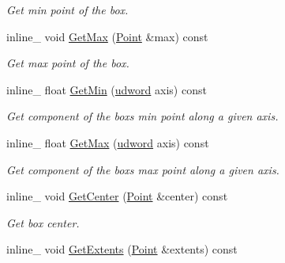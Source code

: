 \begin{DoxyCompactItemize}
\begin{DoxyCompactList}\small\item\em Get min point of the box. \end{DoxyCompactList}\item 
inline\+\_\+ void \hyperlink{classOpcode_1_1AABB_a5e6b0466007c308755a4280007d2c0ee}{Get\+Max} (\hyperlink{classOpcode_1_1Point}{Point} \&max) const \hypertarget{classOpcode_1_1AABB_a5e6b0466007c308755a4280007d2c0ee}{}\label{classOpcode_1_1AABB_a5e6b0466007c308755a4280007d2c0ee}

\begin{DoxyCompactList}\small\item\em Get max point of the box. \end{DoxyCompactList}\item 
inline\+\_\+ float \hyperlink{classOpcode_1_1AABB_a722ee19222271ce6066e7c2437b45e3d}{Get\+Min} (\hyperlink{IceTypes_8h_a44c6f1920ba5551225fb534f9d1a1733}{udword} axis) const \hypertarget{classOpcode_1_1AABB_a722ee19222271ce6066e7c2437b45e3d}{}\label{classOpcode_1_1AABB_a722ee19222271ce6066e7c2437b45e3d}

\begin{DoxyCompactList}\small\item\em Get component of the box\textquotesingle{}s min point along a given axis. \end{DoxyCompactList}\item 
inline\+\_\+ float \hyperlink{classOpcode_1_1AABB_acf448abb3a0abb3165b7be4d8a4872da}{Get\+Max} (\hyperlink{IceTypes_8h_a44c6f1920ba5551225fb534f9d1a1733}{udword} axis) const \hypertarget{classOpcode_1_1AABB_acf448abb3a0abb3165b7be4d8a4872da}{}\label{classOpcode_1_1AABB_acf448abb3a0abb3165b7be4d8a4872da}

\begin{DoxyCompactList}\small\item\em Get component of the box\textquotesingle{}s max point along a given axis. \end{DoxyCompactList}\item 
inline\+\_\+ void \hyperlink{classOpcode_1_1AABB_a2061784d0e109f9f56b28a6a2563a6ee}{Get\+Center} (\hyperlink{classOpcode_1_1Point}{Point} \&center) const \hypertarget{classOpcode_1_1AABB_a2061784d0e109f9f56b28a6a2563a6ee}{}\label{classOpcode_1_1AABB_a2061784d0e109f9f56b28a6a2563a6ee}

\begin{DoxyCompactList}\small\item\em Get box center. \end{DoxyCompactList}\item 
inline\+\_\+ void \hyperlink{classOpcode_1_1AABB_adf84613f075324b49b8c5611179ea20c}{Get\+Extents} (\hyperlink{classOpcode_1_1Point}{Point} \&extents) const \hypertarget{classOpcode_1_1AABB_adf84613f075324b49b8c5611179ea20c}{}\label{classOpcode_1_1AABB_adf84613f075324b49b8c5611179ea20c}


\end{DoxyCompactItemize}
